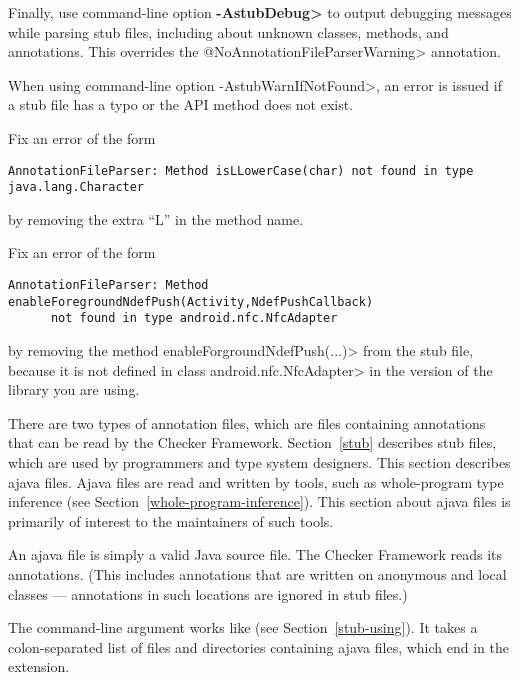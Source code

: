 Finally,
use command-line option {\bf\<-AstubDebug>} to output debugging messages while
parsing stub files, including about unknown classes, methods, and
annotations.  This overrides the \<@NoAnnotationFileParserWarning> annotation.




When using command-line option \<-AstubWarnIfNotFound>,
an error is issued if a stub file has a typo or the API method does not
exist.

Fix an error of the form
\begin{Verbatim}
AnnotationFileParser: Method isLLowerCase(char) not found in type java.lang.Character
\end{Verbatim}

\noindent
by removing the extra ``L'' in the method name.

Fix an error of the form
\begin{Verbatim}
AnnotationFileParser: Method enableForegroundNdefPush(Activity,NdefPushCallback)
      not found in type android.nfc.NfcAdapter
\end{Verbatim}

\noindent
by removing the method \<enableForgroundNdefPush(...)> from
the stub file, because it is not defined in class \<android.nfc.NfcAdapter>
in the version of the library you are using.



There are two types of annotation files, which are files containing annotations that
can be read by the Checker Framework.
Section~\ref{stub} describes stub files, which are used by programmers and
type system designers.
This section describes ajava files.
Ajava files are read and written by tools, such as whole-program type
inference (see Section~\ref{whole-program-inference}).  This section about
ajava files is primarily of interest to the maintainers of such tools.

An ajava file is simply a valid Java source file.
The Checker Framework reads its annotations.
(This includes annotations that are written
on anonymous and local classes --- annotations in such locations are ignored
in stub files.)



The  command-line argument works like  (see
Section~\ref{stub-using}). It takes a colon-separated list of
files and directories containing ajava files, which end in the 
extension.

